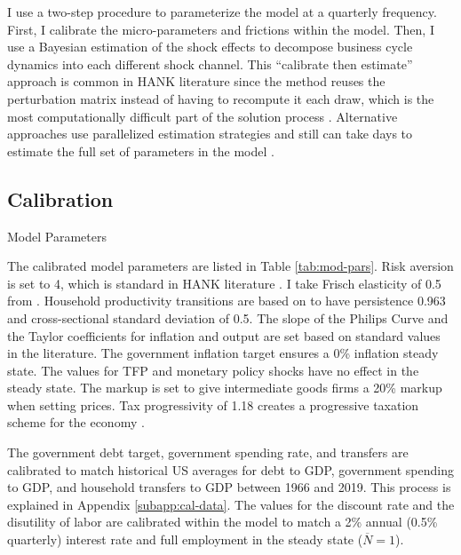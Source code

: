 I use a two-step procedure to parameterize the model at a quarterly frequency. First, I calibrate the micro-parameters and frictions within the model. Then, I use a Bayesian estimation of the shock effects to decompose business cycle dynamics into each different shock channel. This ``calibrate then estimate'' approach is common in HANK literature since the method reuses the perturbation matrix instead of having to recompute it each draw, which is the most computationally difficult part of the solution process \autocites{winberry2018method}{auclert2020micro}{auclert2021using}{bayer2024shocks}. Alternative approaches use parallelized estimation strategies and still can take days to estimate the full set of parameters in the model \autocite{acharya2023estimating}.


\subsection{Calibration}

\begin{table}[t]
    \centering
    \caption{Model Parameters}
    
    \label{tab:mod-pars}
\end{table}

The calibrated model parameters are listed in Table \ref{tab:mod-pars}. Risk aversion is set to 4, which is standard in HANK literature \autocite{kaplan2018monetary}. I take Frisch elasticity of 0.5 from \autocite{chetty2012bounds}. Household productivity transitions are based on \textcite{storesletten2004cyclical} to have persistence 0.963 and cross-sectional standard deviation of 0.5. The slope of the Philips Curve and the Taylor coefficients for inflation and output are set based on standard values in the literature. The government inflation target ensures a 0\% inflation steady state. The values for TFP and monetary policy shocks have no effect in the steady state. The markup is set to give intermediate goods firms a 20\% markup when setting prices. Tax progressivity of 1.18 creates a progressive taxation scheme for the economy \autocite{heathcote2017optimal}.

The government debt target, government spending rate, and transfers are calibrated to match historical US averages for debt to GDP, government spending to GDP, and household transfers to GDP between 1966 and 2019. This process is explained in Appendix \ref{subapp:cal-data}. The values for the discount rate and the disutility of labor are calibrated within the model to match a 2\% annual (0.5\% quarterly) interest rate and full employment in the steady state ($\overline{N} = 1$).


